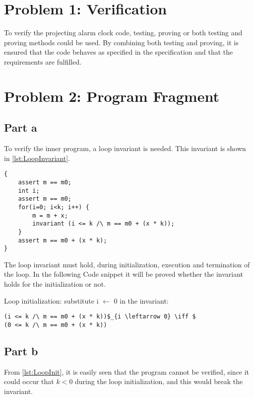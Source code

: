 \documentclass[Main_Assignment4]{subfiles}
\begin{document}
\section{Problem 1: Verification}
To verify the projecting alarm clock code, testing, proving or both testing and proving methods could be used. 
By combining both testing and proving, it is ensured that the code behaves as specified in the specification and that the requirements are fulfilled.

\section{Problem 2: Program Fragment} %
\label{sec:problem_2_program_fragment}


\subsection{Part a}
To verify the inner program, a loop invariant is needed. 
This invariant is shown in \codeTitle \ref{lst:LoopInvariant}. 

\begin{lstlisting}[mathescape, caption=Loop invariant, style=Code-C++, label=lst:LoopInvariant]
{
	assert m == m0;
	int i;
	assert m == m0;
	for(i=0; i<k; i++) {
		m = m + x;
		invariant (i <= k /\ m == m0 + (x * k));
	}
	assert m == m0 + (x * k);
}
\end{lstlisting}

The loop invariant must hold, during initialization, execution and termination of the loop. In the following Code snippet it will be proved whether the invariant holds for the initialization or not.


Loop initialization: substitute i $\leftarrow$ 0 in the invariant:
\begin{lstlisting}[mathescape, caption=Loop initialization, style=Code-C++, label=lst:LoopInit]
(i <= k /\ m == m0 + (x * k))$_{i \leftarrow 0} \iff $ 
(0 <= k /\ m == m0 + (x * k))  
\end{lstlisting}

\subsection{Part b}
From \codeTitle \ref{lst:LoopInit}, it is easily seen that the program cannot be verified, since it could occur that $k < 0$ during the loop initialization, and this would break the invariant.
\end{document}
